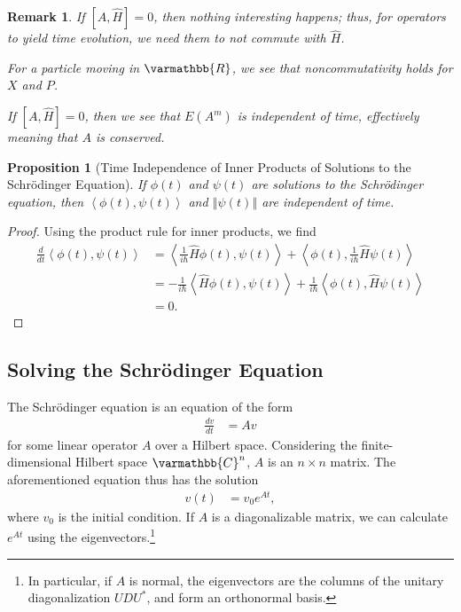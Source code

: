 \documentclass[12pt]{extarticle}
\newtheorem*{remark}{Remark}
\newcommand{\R}{\varmathbb{R}}
\newcommand{\C}{\varmathbb{C}}
\newcommand{\iprod}[2]{\left\langle #1,#2\right\rangle}
\newcommand{\norm}[1]{\left\Vert #1\right\Vert}
\theoremstyle{plain}
\newtheorem*{proposition}{Proposition}%
\theoremstyle{definition}
\theoremstyle{remark}
\renewcommand{\newline}{\hfill\break}
\begin{document}
  \begin{remark}
    If $[A,\hat{H}] = 0$, then nothing interesting happens; thus, for operators to yield time evolution, we need them to \textit{not} commute with $\hat{H}$.\newline

    For a particle moving in $\R$, we see that noncommutativity holds for $X$ and $P$.\newline

    If $[A,\hat{H}] = 0$, then we see that $E(A^{m})$ is independent of time, effectively meaning that $A$ is conserved.
  \end{remark}
  \begin{proposition}[Time Independence of Inner Products of Solutions to the Schrödinger Equation]
    If $\phi(t)$ and $\psi(t)$ are solutions to the Schrödinger equation, then $\iprod{\phi(t)}{\psi(t)}$ and $\norm{\psi(t)}$ are independent of time.
  \end{proposition}
  \begin{proof}
    Using the product rule for inner products, we find
    \begin{align*}
      \frac{d}{dt}\iprod{\phi(t)}{\psi(t)} &= \iprod{\frac{1}{i\hbar}\hat{H}\phi(t)}{\psi(t)} + \iprod{\phi(t)}{\frac{1}{i\hbar}\hat{H}\psi(t)}\\
                                           &= -\frac{1}{i\hbar}\iprod{\hat{H}\phi(t)}{\psi(t)} + \frac{1}{i\hbar}\iprod{\phi(t)}{\hat{H}\psi(t)}\\
                                           &= 0.
    \end{align*}
  \end{proof}
  \subsection{Solving the Schrödinger Equation}%
  The Schrödinger equation is an equation of the form
  \begin{align*}
    \frac{dv}{dt} &= Av
  \end{align*}
  for some linear operator $A$ over a Hilbert space. Considering the finite-dimensional Hilbert space $\C^{n}$, $A$ is an $n\times n$ matrix. The aforementioned equation thus has the solution
  \begin{align*}
    v(t) &= v_0e^{At},
  \end{align*}
  where $v_0$ is the initial condition. If $A$ is a diagonalizable matrix, we can calculate $e^{At}$ using the eigenvectors.\footnote{In particular, if $A$ is normal, the eigenvectors are the columns of the unitary diagonalization $UDU^{\ast}$, and form an orthonormal basis.}\newline
\end{document}

